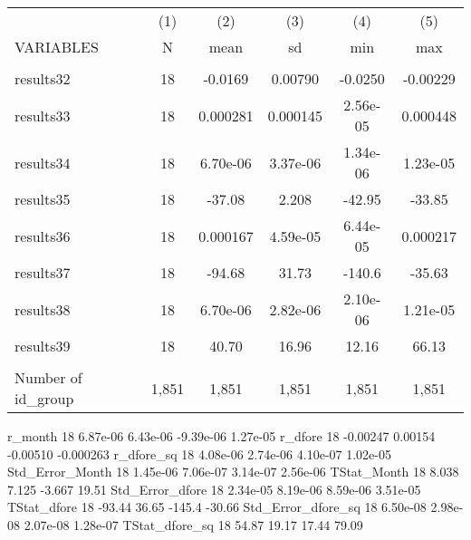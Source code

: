 \begin{tabular}{lccccc} \hline
 & (1) & (2) & (3) & (4) & (5) \\
VARIABLES & N & mean & sd & min & max \\ \hline
 &  &  &  &  &  \\


results32 & 18 & -0.0169 & 0.00790 & -0.0250 & -0.00229 \\
results33 & 18 & 0.000281 & 0.000145 & 2.56e-05 & 0.000448 \\
results34 & 18 & 6.70e-06 & 3.37e-06 & 1.34e-06 & 1.23e-05 \\
results35 & 18 & -37.08 & 2.208 & -42.95 & -33.85 \\
results36 & 18 & 0.000167 & 4.59e-05 & 6.44e-05 & 0.000217 \\
results37 & 18 & -94.68 & 31.73 & -140.6 & -35.63 \\
results38 & 18 & 6.70e-06 & 2.82e-06 & 2.10e-06 & 1.21e-05 \\
results39 & 18 & 40.70 & 16.96 & 12.16 & 66.13 \\
 &  &  &  &  &  \\
 Number of id\_group & 1,851 & 1,851 & 1,851 & 1,851 & 1,851 \\ \hline
\end{tabular}

r_month	18	6.87e-06	6.43e-06	-9.39e-06	1.27e-05
r_dfore	18	-0.00247	0.00154	-0.00510	-0.000263
r_dfore_sq	18	4.08e-06	2.74e-06	4.10e-07	1.02e-05
Std_Error_Month	18	1.45e-06	7.06e-07	3.14e-07	2.56e-06
TStat_Month	18	8.038	7.125	-3.667	19.51
Std_Error_dfore	18	2.34e-05	8.19e-06	8.59e-06	3.51e-05
TStat_dfore	18	-93.44	36.65	-145.4	-30.66
Std_Error_dfore_sq	18	6.50e-08	2.98e-08	2.07e-08	1.28e-07
TStat_dfore_sq	18	54.87	19.17	17.44	79.09